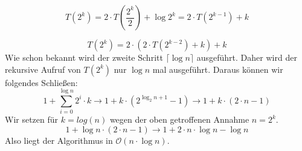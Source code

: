\documentclass[a4paper]{article}
\begin{document}
\begin{equation}
T(2^k) = 2 \cdot T(\frac{2^{k}}{2}) + \log 2^k = 2 \cdot T(2^{k-1}) + k
\end{equation}

\begin{equation}
T(2^k) = 2 \cdot \left( 2 \cdot T(2^{k-2}) + k \right) + k
\end{equation}
Wie schon bekannt wird der zweite Schritt $\lceil \log n \rceil$ ausgeführt. Daher wird der rekursive Aufruf von $T(2^k)$ nur $\log n$ mal ausgeführt. Daraus können wir folgendes Schließen:
\begin{equation}
1 + \sum_{i=0}^{\log n} 2^i \cdot k \rightarrow 1 + k \cdot (2^{\log_2 n + 1} - 1) \rightarrow 1 + k \cdot (2 \cdot n - 1)
\end{equation}
Wir setzen für $k = log(n)$ wegen der oben getroffenen Annahme $n = 2^k$.
\begin{equation}
1 + \log n \cdot (2 \cdot n - 1) \rightarrow 1 + 2 \cdot n \cdot \log n - \log n
\end{equation}
Also liegt der Algorithmus in $\mathcal{O}(n \cdot \log n)$.
\end{document}
